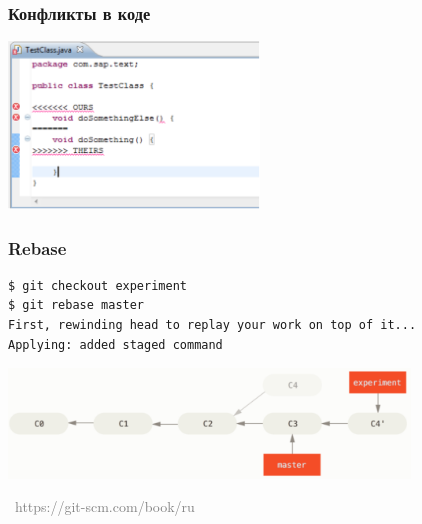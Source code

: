 \documentclass[xetex,mathserif,serif]{beamer}
\newcommand{\attribution}[1] {
\vspace{-5mm}\begin{flushright}\begin{scriptsize}\textcolor{gray}{\textcopyright\, #1}\end{scriptsize}\end{flushright}
}
\begin{document}
	\begin{frame}
		\frametitle{Конфликты в коде}
		\begin{center}
			\includegraphics[width=0.5\textwidth]{conflictsInCode.png}
		\end{center}
	\end{frame}

	\begin{frame}[fragile]
		\frametitle{Rebase}
		\begin{verbatim}
$ git checkout experiment
$ git rebase master
First, rewinding head to replay your work on top of it...
Applying: added staged command
		\end{verbatim}
		\begin{center}
			\includegraphics[width=0.8\textwidth]{rebase.png}
			\attribution{https://git-scm.com/book/ru}
		\end{center}
	\end{frame}
\end{document}
